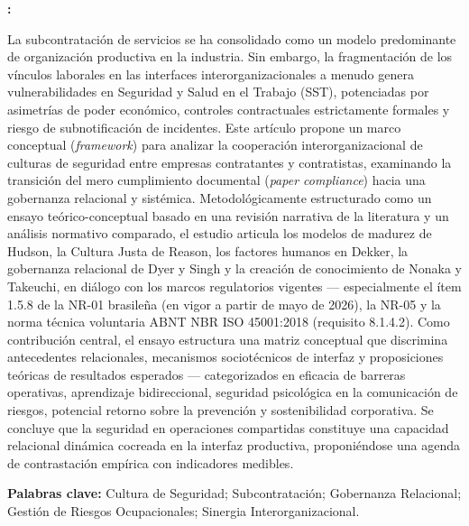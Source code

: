 \documentclass[12pt,a4paper]{article}
\renewenvironment{abstract}{%
  \small\begin{list}{}{%
    \setlength{\leftmargin}{0cm}%
    \setlength{\rightmargin}{0cm}%
  }%
  \item\relax\textbf{\abstractname:}\space
}{\end{list}}
\begin{document}
\begin{abstract}
\fontsize{10}{12}\selectfont\singlespacing\justifying
La subcontratación de servicios se ha consolidado como un modelo predominante de organización productiva en la industria. Sin embargo, la fragmentación de los vínculos laborales en las interfaces interorganizacionales a menudo genera vulnerabilidades en Seguridad y Salud en el Trabajo (SST), potenciadas por asimetrías de poder económico, controles contractuales estrictamente formales y riesgo de subnotificación de incidentes. Este artículo propone un marco conceptual (\textit{framework}) para analizar la cooperación interorganizacional de culturas de seguridad entre empresas contratantes y contratistas, examinando la transición del mero cumplimiento documental (\textit{paper compliance}) hacia una gobernanza relacional y sistémica. Metodológicamente estructurado como un ensayo teórico-conceptual basado en una revisión narrativa de la literatura y un análisis normativo comparado, el estudio articula los modelos de madurez de Hudson, la Cultura Justa de Reason, los factores humanos en Dekker, la gobernanza relacional de Dyer y Singh y la creación de conocimiento de Nonaka y Takeuchi, en diálogo con los marcos regulatorios vigentes — especialmente el ítem 1.5.8 de la NR-01 brasileña (en vigor a partir de mayo de 2026), la NR-05 y la norma técnica voluntaria ABNT NBR ISO 45001:2018 (requisito 8.1.4.2). Como contribución central, el ensayo estructura una matriz conceptual que discrimina antecedentes relacionales, mecanismos sociotécnicos de interfaz y proposiciones teóricas de resultados esperados — categorizados en eficacia de barreras operativas, aprendizaje bidireccional, seguridad psicológica en la comunicación de riesgos, potencial retorno sobre la prevención y sostenibilidad corporativa. Se concluye que la seguridad en operaciones compartidas constituye una capacidad relacional dinámica cocreada en la interfaz productiva, proponiéndose una agenda de contrastación empírica con indicadores medibles.
\end{abstract}

\noindent\fontsize{10}{12}\selectfont\textbf{Palabras clave:} Cultura de Seguridad; Subcontratación; Gobernanza Relacional; Gestión de Riesgos Ocupacionales; Sinergia Interorganizacional.

\vspace{0.4cm}

\end{document}
